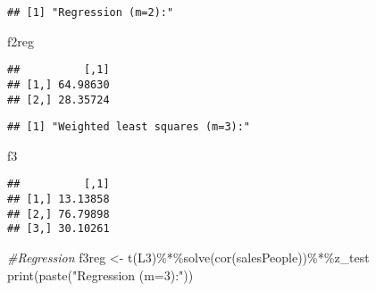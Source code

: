 \documentclass[
]{article}
\newenvironment{Shaded}{\begin{snugshade}}{\end{snugshade}}
\newcommand{\CommentTok}[1]{\textcolor[rgb]{0.56,0.35,0.01}{\textit{#1}}}
\newcommand{\FunctionTok}[1]{\textcolor[rgb]{0.00,0.00,0.00}{#1}}
\newcommand{\NormalTok}[1]{#1}
\newcommand{\OtherTok}[1]{\textcolor[rgb]{0.56,0.35,0.01}{#1}}
\newcommand{\SpecialCharTok}[1]{\textcolor[rgb]{0.00,0.00,0.00}{#1}}
\newcommand{\StringTok}[1]{\textcolor[rgb]{0.31,0.60,0.02}{#1}}
\begin{document}
\begin{verbatim}
## [1] "Regression (m=2):"
\end{verbatim}

\begin{Shaded}
\begin{Highlighting}[]
\NormalTok{f2reg}
\end{Highlighting}
\end{Shaded}

\begin{verbatim}
##          [,1]
## [1,] 64.98630
## [2,] 28.35724
\end{verbatim}

\begin{Shaded}
\end{Shaded}

\begin{verbatim}
## [1] "Weighted least squares (m=3):"
\end{verbatim}

\begin{Shaded}
\begin{Highlighting}[]
\NormalTok{f3}
\end{Highlighting}
\end{Shaded}

\begin{verbatim}
##          [,1]
## [1,] 13.13858
## [2,] 76.79898
## [3,] 30.10261
\end{verbatim}

\begin{Shaded}
\begin{Highlighting}[]
\CommentTok{\#Regression}
\NormalTok{f3reg }\OtherTok{\textless{}{-}} \FunctionTok{t}\NormalTok{(L3)}\SpecialCharTok{\%*\%}\FunctionTok{solve}\NormalTok{(}\FunctionTok{cor}\NormalTok{(salesPeople))}\SpecialCharTok{\%*\%}\NormalTok{z\_test}
\FunctionTok{print}\NormalTok{(}\FunctionTok{paste}\NormalTok{(}\StringTok{"Regression (m=3):"}\NormalTok{))}
\end{Highlighting}
\end{Shaded}
\end{document}
